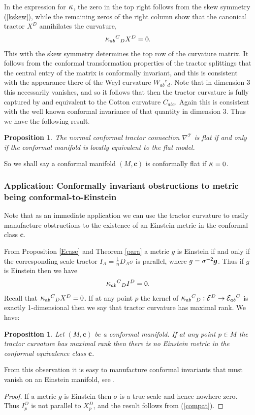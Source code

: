 \documentclass[a4paper,12pt]{amsart}
\newcommand{\kappal}{\mbox{\large{$\kappa$}}}
\def\Cal{\mathcal}
\newcommand{\cc}{\boldsymbol{c}}
\newcommand{\ce}{{\Cal E}}
\newcommand{\cT}{{\mathcal T}}
\def\bg{\mbox{\boldmath $g$}}
\newcommand{\si}{\sigma}
\newtheorem{proposition}[theorem]{Proposition}
\theoremstyle{remark}
\newcommand{\nn}[1]{(\ref{#1})}
\begin{document}
In the expression for $\kappal$,  the
  zero in the top right follows from the skew symmetry \nn{kskew},
  while the remaining zeros of the right column show that the
  canonical tractor $X^D$ annihilates the curvature,
$$
{\kappal}_{ab}{}^C{}_D X^D =0. 
$$ 
This with the skew symmetry determines the top row of the curvature
matrix. It follows from the conformal transformation properties of the
tractor splittings that the central entry of the matrix is conformally
invariant, and this is consistent with the appearance there of the
Weyl curvature $W_{ab}{}^c{}_d $. Note that in dimension 3 this
necessarily vanishes, and so it
follows that then the tractor curvature is fully
captured by and equivalent to the Cotton curvature $C_{abc}$. Again
this is consistent with the well known conformal invariance of that quantity in dimension
3. Thus 
we have the following result. 
\begin{proposition}\label{curvOb}
The normal conformal tractor connection $\nabla^\cT$ is flat if and
only if the conformal manifold is locally equivalent to the flat model. 
\end{proposition}
\noindent So we shall say a conformal manifold $(M,\cc)$ is conformally flat if $\kappal=0$.

\subsubsection{Application: Conformally invariant obstructions to metric being conformal-to-Einstein}\label{obstr}

\newcommand{\kk}{\mbox{\large{$\kappa$}}}
Note that as an immediate application we can use the tractor curvature
to easily manufacture obstructions to the existence of an Einstein
metric in the conformal class $\cc$. 

From Proposition \ref{Ecase} and Theorem \ref{para} a metric $g$ is Einstein
if and only if the corresponding scale tractor $I_A=\frac{1}{n}D_A \si$ is parallel, where $g=\si^{-2}\bg$.
Thus if $g$ is Einstein then we have 
\begin{equation}\label{compat}
\kk_{ab}{}^C{}_DI^D=0 .
\end{equation}
Recall that $\kk_{ab}{}^C{}_DX^D=0$. If at any point $p$ the kernel
of $\kk_{ab}{}^C{}_D:\ce^D\to \ce_{ab}{}^C$ is exactly 1-dimensional
then we say that tractor curvature has maximal rank. We have:
\begin{proposition}\label{obp} Let $(M,\cc)$ be a conformal manifold.
If at any point $p\in M$ the tractor curvature has maximal rank 
then
there is no Einstein metric in the conformal equivalence class $\cc$.
\end{proposition}
From this observation it is easy to manufacture conformal invariants
that must vanish on an Einstein manifold, see \cite{GN}.
\begin{proof}
If a metric $g$ is Einstein then $\si$ is a true scale and hence
nowhere zero.  Thus $I^D_p$ is not parallel to $X^D_p$, and the
result follows from \nn{compat}. 
\end{proof}
\end{document}
